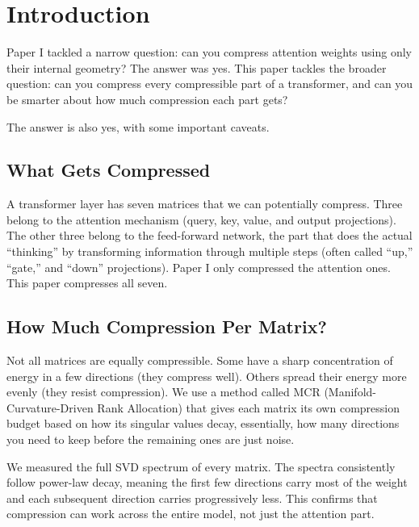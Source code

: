 \documentclass[11pt]{article}
\begin{document}
\section{Introduction}

Paper I tackled a narrow question: can you compress attention weights using
only their internal geometry? The answer was yes. This paper tackles the
broader question: can you compress every compressible part of a
transformer, and can you be smarter about how much compression each part
gets?

The answer is also yes, with some important caveats.

\subsection{What Gets Compressed}

A transformer layer has seven matrices that we can potentially compress. Three
belong to the attention mechanism (query, key, value, and output projections).
The other three belong to the feed-forward network, the part that does the
actual ``thinking'' by transforming information through multiple steps (often
called ``up,'' ``gate,'' and ``down'' projections). Paper I only compressed the
attention ones. This paper compresses all seven.

\subsection{How Much Compression Per Matrix?}

Not all matrices are equally compressible. Some have a sharp concentration of
energy in a few directions (they compress well). Others spread their energy
more evenly (they resist compression). We use a method called MCR
(Manifold-Curvature-Driven Rank Allocation) that gives each matrix its own
compression budget based on how its singular values decay, essentially, how
many directions you need to keep before the remaining ones are just noise.

We measured the full SVD spectrum of every matrix. The spectra consistently
follow power-law decay, meaning the first few directions carry most of the
weight and each subsequent direction carries progressively less. This confirms
that compression can work across the entire model, not just the attention part.
\end{document}
